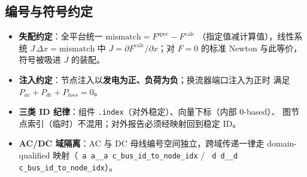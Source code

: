 \documentclass[UTF8,fontset=fandol,a4paper,11pt]{ctexart}
\makeatletter
\newcommand{\fld}[1]{\texttt{\fld@scan#1\fld@stop}}
\def\fld@scan#1{%
  \ifx#1\fld@stop
  \else
    \ifx#1\_\_\allowbreak\else#1\fi
    \expandafter\fld@scan
  \fi}
\makeatother
\begin{document}
\subsection{编号与符号约定}
\begin{itemize}
  \item \textbf{失配约定}：全平台统一 $\mathrm{mismatch}=F^{\mathrm{spec}}-F^{\mathrm{calc}}$
        （指定值减计算值），线性系统 $J\,\Delta x=\mathrm{mismatch}$ 中
        $J=\partial F^{\mathrm{calc}}/\partial x$；对 $F=0$ 的标准 Newton 与此等价，
        符号被吸进 $J$ 的装配。
  \item \textbf{注入约定}：节点注入以\textbf{发电为正、负荷为负}；换流器端口注入为正时
        满足 $P_{ac}+P_{dc}+P_{loss}=0$。
  \item \textbf{三类 ID 纪律}：组件 \texttt{.index}（对外稳定）、向量下标（内部 0-based）、
        图节点索引（临时）不混用；对外报告必须经映射回到稳定 ID。
  \item \textbf{AC/DC 域隔离}：AC 与 DC 母线编号空间独立，跨域传递一律走
        domain-qualified 映射（\fld{ac\_bus\_id\_to\_node\_idx} /
        \fld{dc\_bus\_id\_to\_node\_idx}）。
\end{itemize}
\end{document}
